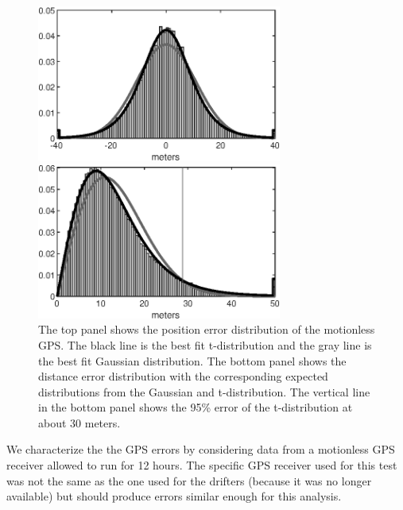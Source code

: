 \documentclass[10pt,journal]{IEEEtran}
\begin{document}
\begin{figure}
  \centerline{\includegraphics[width=19pc,angle=0]{figures/gps_error_distribution}}
  \centerline{\includegraphics[width=19pc,angle=0]{figures/gps_distance_error_distribution}} 
  \caption{The top panel shows the position error distribution of the motionless GPS. The black line is the best fit t-distribution and the gray line is the best fit Gaussian distribution. The bottom panel shows the distance error distribution with the corresponding expected distributions from the Gaussian and t-distribution. The vertical line in the bottom panel shows the 95\% error of the t-distribution at about 30 meters.}
  \label{motionless_error}
\end{figure}

We characterize the the GPS errors by considering data from a motionless GPS receiver allowed to run for 12 hours. The specific GPS receiver used for this test was not the same as the one used for the drifters (because it was no longer available) but should produce errors similar enough for this analysis.
\end{document}
